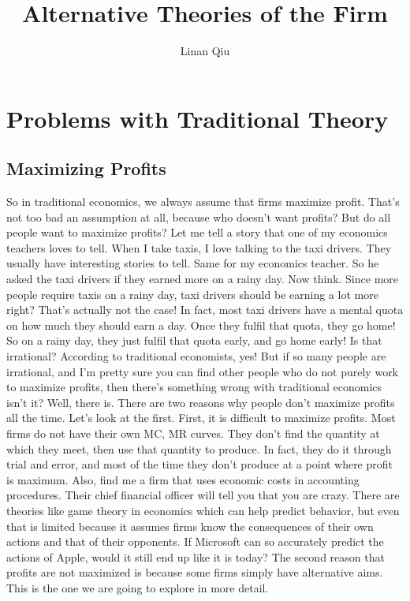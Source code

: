 \documentclass[DIV=classic,11pt,numbers=noenddot,listof=totoc,bibliography=totoc,parskip]{scrartcl}
\title{Alternative Theories of the Firm}
\author{Linan Qiu}
\date{}
\begin{document}
\maketitle
\tableofcontents
\newpage
\section{Problems with Traditional Theory}
\subsection{Maximizing Profits}
So in traditional economics, we always assume that firms maximize profit. That’s not too bad an assumption at all, because who doesn’t want profits? But do all people want to maximize profits? Let me tell a story that one of my economics teachers loves to tell. When I take taxis, I love talking to the taxi drivers. They usually have interesting stories to tell. Same for my economics teacher. So he asked the taxi drivers if they earned more on a rainy day. Now think. Since more people require taxis on a rainy day, taxi drivers should be earning a lot more right? That’s actually not the case! In fact, most taxi drivers have a mental quota on how much they should earn a day. Once they fulfil that quota, they go home! So on a rainy day, they just fulfil that quota early, and go home early! Is that irrational? According to traditional economists, yes! But if so many people are irrational, and I’m pretty sure you can find other people who do not purely work to maximize profits, then there’s something wrong with traditional economics isn’t it? Well, there is. There are two reasons why people don’t maximize profits all the time. Let’s look at the first. First, it is difficult to maximize profits. Most firms do not have their own MC, MR curves. They don’t find the quantity at which they meet, then use that quantity to produce. In fact, they do it through trial and error, and most of the time they don’t produce at a point where profit is maximum. Also, find me a firm that uses economic costs in accounting procedures. Their chief financial officer will tell you that you are crazy. There are theories like game theory in economics which can help predict behavior, but even that is limited because it assumes firms know the consequences of their own actions and that of their opponents. If Microsoft can so accurately predict the actions of Apple, would it still end up like it is today? The second reason that profits are not maximized is because some firms simply have alternative aims. This is the one we are going to explore in more detail.
\end{document}
